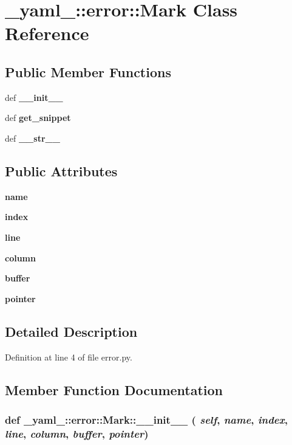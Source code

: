 \section{\_\-yaml\_\-::error::Mark Class Reference}
\label{class__yaml___1_1error_1_1Mark}
\subsection*{Public Member Functions}
\begin{CompactItemize}
\item 
def {\bf \_\-\_\-init\_\-\_\-}
\item 
def {\bf get\_\-snippet}
\item 
def {\bf \_\-\_\-str\_\-\_\-}
\end{CompactItemize}
\subsection*{Public Attributes}
\begin{CompactItemize}
\item 
{\bf name}
\item 
{\bf index}
\item 
{\bf line}
\item 
{\bf column}
\item 
{\bf buffer}
\item 
{\bf pointer}
\end{CompactItemize}


\subsection{Detailed Description}


Definition at line 4 of file error.py.

\subsection{Member Function Documentation}
\subsubsection{\setlength{\rightskip}{0pt plus 5cm}def \_\-yaml\_\-::error::Mark::\_\-\_\-init\_\-\_\- ( {\em self},  {\em name},  {\em index},  {\em line},  {\em column},  {\em buffer},  {\em pointer})}\label{class__yaml___1_1error_1_1Mark_c0e7860357c5c03e0d268c4899c1b9b7}




